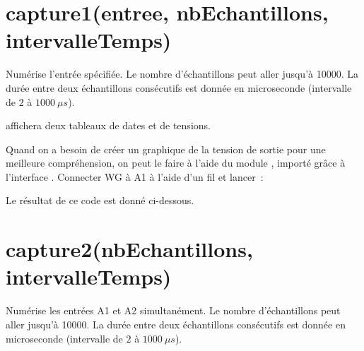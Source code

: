 \documentclass[a4paper,12pt,french]{sphinxmanual}
\let\sphinxpxdimen\pdfpxdimen\else\newdimen\sphinxpxdimen
\begin{document}
\section{capture1(entree, nbEchantillons, intervalleTemps)}
\label{\detokenize{9.0:capture1-entree-nbechantillons-intervalletemps}}
Numérise l’entrée spécifiée. Le nombre d’échantillons peut aller jusqu’à
10000. La durée entre deux échantillons consécutifs est donnée en
microseconde (intervalle de \(2\) à \(1000~\mu s\)).

\begin{sphinxVerbatim}[commandchars=\\\{\}]
   
\end{sphinxVerbatim}

affichera deux tableaux de dates et de tensions.

Quand on a besoin de créer un graphique de la tension de sortie pour
une meilleure compréhension, on peut le faire à l’aide du module ,
importé grâce à l’interface . Connecter WG à A1 à l’aide
d’un fil et lancer :

\begin{sphinxVerbatim}[commandchars=\\\{\}]
   
 
    
\end{sphinxVerbatim}

Le résultat de ce code est donné ci-dessous.

\noindent\sphinxincludegraphics[width=400\sphinxpxdimen]{{sine}.pdf}


\section{capture2(nbEchantillons, intervalleTemps)}
\label{\detokenize{9.0:capture2-nbechantillons-intervalletemps}}
Numérise les entrées A1 et A2 simultanément. Le nombre d’échantillons
peut aller jusqu’à 10000. La durée entre deux échantillons consécutifs
est donnée en microseconde (intervalle de \(2\) à \(1000~\mu s\)).
\end{document}
